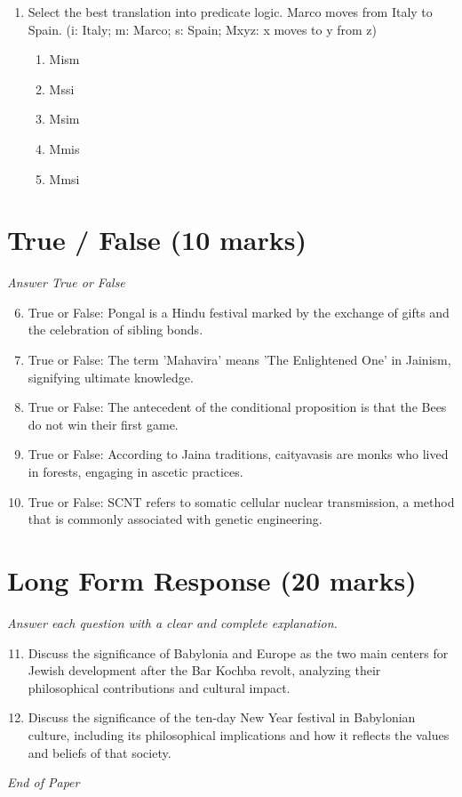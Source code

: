 \documentclass[12pt]{article}
\begin{document}
\begin{enumerate}[label=\arabic*.]
\begin{enumerate}[label=(\alph*)]
    \item are the same as behavioral states
    \item exist
    \item can be directly observed
    \item are always visible
\end{enumerate}
\item Select the best translation into predicate logic. Marco moves from Italy to Spain. (i: Italy; m: Marco; s: Spain; Mxyz: x moves to y from z)
\begin{enumerate}[label=(\alph*)]
    \item Mism
    \item Mssi
    \item Msim
    \item Mmis
    \item Mmsi
\end{enumerate}
\end{enumerate}

\section*{True / False (10 marks)}
\textit{Answer True or False}
\begin{enumerate}[label=\arabic*.]
\setcounter{enumi}{5}
\item True or False: Pongal is a Hindu festival marked by the exchange of gifts and the celebration of sibling bonds.
\item True or False: The term 'Mahavira' means 'The Enlightened One' in Jainism, signifying ultimate knowledge.
\item True or False: The antecedent of the conditional proposition is that the Bees do not win their first game.
\item True or False: According to Jaina traditions, caityavasis are monks who lived in forests, engaging in ascetic practices.
\item True or False: SCNT refers to somatic cellular nuclear transmission, a method that is commonly associated with genetic engineering.
\end{enumerate}

\section*{Long Form Response (20 marks)}
\textit{Answer each question with a clear and complete explanation.}
\begin{enumerate}[label=\arabic*.]
\setcounter{enumi}{10}
\item Discuss the significance of Babylonia and Europe as the two main centers for Jewish development after the Bar Kochba revolt, analyzing their philosophical contributions and cultural impact.
\item Discuss the significance of the ten-day New Year festival in Babylonian culture, including its philosophical implications and how it reflects the values and beliefs of that society.
\end{enumerate}

\vfill
\noindent\textit{End of Paper}
\end{document}
